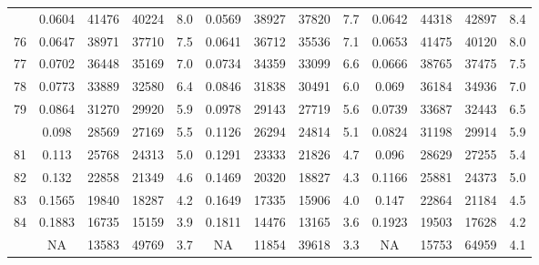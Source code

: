 \documentclass[
  14pt,
]{article}
\begin{document}
\begin{longtable}[t]{lcccccccccccc}
\addlinespace
75 & 0.0604 & 41476 & 40224 & 8.0 & 0.0569 & 38927 & 37820 & 7.7 & 0.0642 & 44318 & 42897 & 8.4\\
76 & 0.0647 & 38971 & 37710 & 7.5 & 0.0641 & 36712 & 35536 & 7.1 & 0.0653 & 41475 & 40120 & 8.0\\
77 & 0.0702 & 36448 & 35169 & 7.0 & 0.0734 & 34359 & 33099 & 6.6 & 0.0666 & 38765 & 37475 & 7.5\\
78 & 0.0773 & 33889 & 32580 & 6.4 & 0.0846 & 31838 & 30491 & 6.0 & 0.069 & 36184 & 34936 & 7.0\\
79 & 0.0864 & 31270 & 29920 & 5.9 & 0.0978 & 29143 & 27719 & 5.6 & 0.0739 & 33687 & 32443 & 6.5\\
\addlinespace
80 & 0.098 & 28569 & 27169 & 5.5 & 0.1126 & 26294 & 24814 & 5.1 & 0.0824 & 31198 & 29914 & 5.9\\
81 & 0.113 & 25768 & 24313 & 5.0 & 0.1291 & 23333 & 21826 & 4.7 & 0.096 & 28629 & 27255 & 5.4\\
82 & 0.132 & 22858 & 21349 & 4.6 & 0.1469 & 20320 & 18827 & 4.3 & 0.1166 & 25881 & 24373 & 5.0\\
83 & 0.1565 & 19840 & 18287 & 4.2 & 0.1649 & 17335 & 15906 & 4.0 & 0.147 & 22864 & 21184 & 4.5\\
84 & 0.1883 & 16735 & 15159 & 3.9 & 0.1811 & 14476 & 13165 & 3.6 & 0.1923 & 19503 & 17628 & 4.2\\
\addlinespace
85 & NA & 13583 & 49769 & 3.7 & NA & 11854 & 39618 & 3.3 & NA & 15753 & 64959 & 4.1\\*
\end{longtable}
\end{document}
